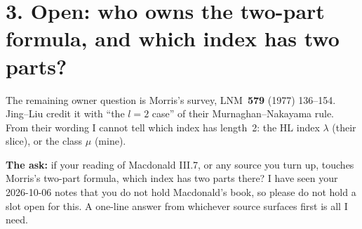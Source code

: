 \documentclass[11pt]{article}
\begin{document}
\section*{3. Open: who owns the two-part formula, and which index has two parts?}
The remaining owner question is Morris's survey, LNM~\textbf{579} (1977) 136--154. Jing--Liu credit it with ``the $l=2$ case'' of their Murnaghan--Nakayama rule. From their wording I cannot tell which index has length~2: the HL index $\lambda$ (their slice), or the class $\mu$ (mine).

\textbf{The ask:} if your reading of Macdonald III.7, or any source you turn up, touches Morris's two-part formula, which index has two parts there? I have seen your 2026-10-06 notes that you do not hold Macdonald's book, so please do not hold a slot open for this. A one-line answer from whichever source surfaces first is all I need.
\end{document}

